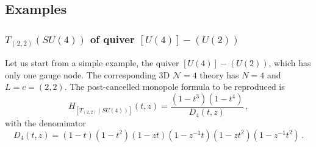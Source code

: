 \documentclass[12pt,a4paper]{article}
\begin{document}
\subsection{Examples}
\subsubsection{$T_{(2,2)}(SU(4))$ of quiver $[U(4)]-(U(2))$}
Let us start from a simple example, the quiver $[U(4)]-(U(2))$, which has only one gauge node. The corresponding 3D $\mathcal{N}=4$ theory has $N=4$ and $L=c=(2,2)$. The post-cancelled monopole formula to be reproduced is 
\begin{equation}
 H_[T_{(2,2)}(SU(4))](t,z)=\frac{(1-t^3)(1-t^4)}{D_4(t,z)}\,,
 \label{eq:42-HS}
\end{equation}
with the denominator 
\begin{equation}
    D_4(t,z)=(1-t)(1-t^2)(1-zt)(1-z^{-1}t)(1-zt^2)(1-z^{-1}t^2)\,.
     \label{eq:42-denominator}
\end{equation}
\end{document}
